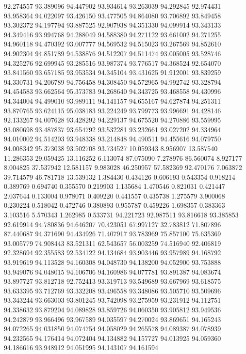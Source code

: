 92.274557
93.389096
94.447902
93.934614
93.263039
94.292845
92.974431
93.958364
94.022097
93.426150
93.477505
94.864080
93.706892
93.849458
93.302372
94.197794
93.887525
92.907938
94.351330
94.099914
93.343133
94.349416
93.994768
94.288049
94.588380
94.271122
93.661002
94.271255
94.960118
94.470392
93.007777
94.569532
94.515023
93.267569
94.852610
94.902304
94.851789
94.538876
94.512207
94.511474
93.005005
93.528746
94.325276
92.699945
93.285516
93.987374
93.776517
94.368524
92.654070
93.841560
93.657185
93.953534
94.345104
93.431625
91.912001
93.839259
94.330731
94.206789
94.756458
94.308450
94.572965
94.992742
93.328794
94.454583
93.662564
95.373783
94.268640
94.343725
93.468558
94.430996
94.344004
94.499010
93.989111
94.141157
94.655167
94.627874
94.251311
93.870765
93.624115
95.038183
93.224249
93.799773
93.996691
94.428146
92.133267
94.007628
93.428292
94.229137
94.675520
94.270886
93.559995
93.080698
93.487837
93.654792
93.532281
93.232661
93.027202
94.334964
94.010002
94.514203
93.948338
93.214848
94.490511
94.455616
94.079750
94.008342
95.373038
93.502708
93.734527
10.059343
8.956907
13.587540
11.286353
29.059425
13.116252
6.113074
87.075090
7.278976
86.560074
8.927177
8.004825
37.537942
12.581157
9.983028
46.250957
57.582369
92.470176
7.063872
39.714579
46.781718
13.539132
1.384430
0.434126
0.606193
0.543354
0.918214
0.389769
0.694740
0.355570
0.219903
1.135684
1.470546
0.821031
0.421447
2.037644
0.133004
0.978071
0.409220
0.441557
0.435738
1.275579
3.900068
0.230224
0.518042
0.472746
0.380893
0.955787
0.459226
1.698357
0.383363
3.103516
5.570343
1.262985
0.533731
94.221723
92.987511
93.816618
93.385853
92.619914
94.780836
94.646207
70.423051
67.997127
32.783812
71.807896
87.440687
94.371690
94.434926
71.407917
93.783969
75.857100
75.635369
93.005779
74.908443
83.521311
62.543657
56.003259
74.516940
92.406819
92.328694
92.355583
92.534122
94.134684
93.903446
93.957989
94.168792
93.919619
94.113528
94.160308
94.048730
94.138200
94.052900
93.753888
93.949076
94.048015
94.106706
94.160986
94.077781
93.891387
94.083674
93.897727
93.812718
92.752413
93.319713
93.549689
93.667969
93.618575
93.633395
93.712769
93.332208
93.496558
93.348086
93.505710
93.509696
93.343244
93.663003
93.801245
93.742098
93.275959
93.231912
94.112751
94.338632
93.879204
94.089828
93.859726
94.060350
93.905812
93.949536
94.242879
93.966496
93.967589
94.035597
94.270024
93.869651
94.165243
94.072265
94.031850
94.074754
94.058029
94.265578
94.089387
94.078939
94.232565
94.176414
94.072404
94.134882
94.157727
94.013925
94.059360
94.186616
93.948912
94.051995
94.143107
94.161594
